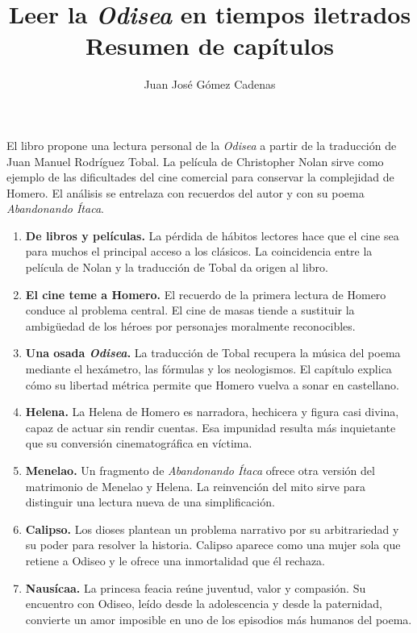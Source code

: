 \documentclass[11pt,a4paper]{article}
\title{Leer la \emph{Odisea} en tiempos iletrados\\[0.4em]
\large Resumen de capítulos}
\author{Juan José Gómez Cadenas}
\date{}
\begin{document}
\maketitle

El libro propone una lectura personal de la \emph{Odisea} a partir de la
traducción de Juan Manuel Rodríguez Tobal. La película de Christopher Nolan
sirve como ejemplo de las dificultades del cine comercial para conservar la
complejidad de Homero. El análisis se entrelaza con recuerdos del autor y con
su poema \emph{Abandonando Ítaca}.

\begin{enumerate}[label=\Roman*.,leftmargin=3.2em,itemsep=0.7em]

\item \textbf{De libros y películas.}
La pérdida de hábitos lectores hace que el cine sea para muchos el principal
acceso a los clásicos. La coincidencia entre la película de Nolan y la
traducción de Tobal da origen al libro.

\item \textbf{El cine teme a Homero.}
El recuerdo de la primera lectura de Homero conduce al problema central. El
cine de masas tiende a sustituir la ambigüedad de los héroes por personajes
moralmente reconocibles.

\item \textbf{Una osada \emph{Odisea}.}
La traducción de Tobal recupera la música del poema mediante el hexámetro, las
fórmulas y los neologismos. El capítulo explica cómo su libertad métrica
permite que Homero vuelva a sonar en castellano.

\item \textbf{Helena.}
La Helena de Homero es narradora, hechicera y figura casi divina, capaz de
actuar sin rendir cuentas. Esa impunidad resulta más inquietante que su
conversión cinematográfica en víctima.

\item \textbf{Menelao.}
Un fragmento de \emph{Abandonando Ítaca} ofrece otra versión del matrimonio de
Menelao y Helena. La reinvención del mito sirve para distinguir una lectura
nueva de una simplificación.

\item \textbf{Calipso.}
Los dioses plantean un problema narrativo por su arbitrariedad y su poder para
resolver la historia. Calipso aparece como una mujer sola que retiene a Odiseo
y le ofrece una inmortalidad que él rechaza.

\item \textbf{Nausícaa.}
La princesa feacia reúne juventud, valor y compasión. Su encuentro con Odiseo,
leído desde la adolescencia y desde la paternidad, convierte un amor imposible
en uno de los episodios más humanos del poema.


\end{enumerate}
\end{document}
